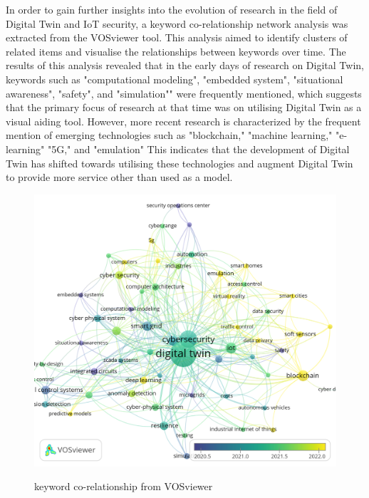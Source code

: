 In order to gain further insights into the evolution of research in the field of Digital Twin and IoT security, a keyword co-relationship network analysis was extracted from the VOSviewer tool. This analysis aimed to identify clusters of related items and visualise the relationships between keywords over time. The results of this analysis revealed that in the early days of research on Digital Twin, keywords such as "computational modeling", "embedded system", "situational awareness", "safety", and "simulation"" were frequently mentioned, which suggests that the primary focus of research at that time was on utilising Digital Twin as a visual aiding tool. However, more recent research is characterized by the frequent mention of emerging technologies such as "blockchain," "machine learning," "e-learning" "5G," and "emulation" This indicates that the development of Digital Twin has shifted towards utilising these technologies and augment Digital Twin to provide more service other than used as a model.



\begin{figure}[H]
    \caption{keyword co-relationship from VOSviewer}
    \includegraphics[width=\textwidth, center]{images/newimages/vosviewer-2oc.png}
    \label{fig:co-occurrence-vosv}
\end{figure}

